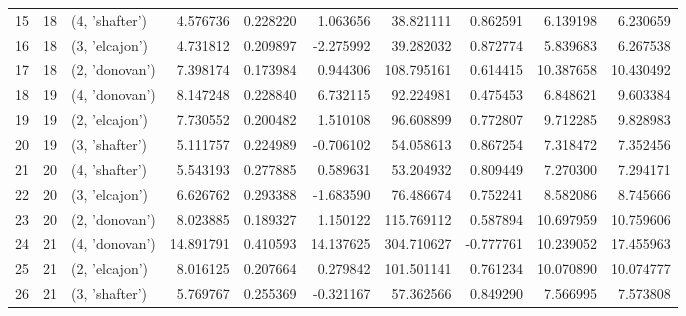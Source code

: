 \begin{tabular}{lrlrrrrrrr}
15 &     18 &  (4, 'shafter') &   4.576736 &  0.228220 &   1.063656 &   38.821111 &  0.862591 &   6.139198 &   6.230659 \\
16 &     18 &  (3, 'elcajon') &   4.731812 &  0.209897 &  -2.275992 &   39.282032 &  0.872774 &   5.839683 &   6.267538 \\
17 &     18 &  (2, 'donovan') &   7.398174 &  0.173984 &   0.944306 &  108.795161 &  0.614415 &  10.387658 &  10.430492 \\
18 &     19 &  (4, 'donovan') &   8.147248 &  0.228840 &   6.732115 &   92.224981 &  0.475453 &   6.848621 &   9.603384 \\
19 &     19 &  (2, 'elcajon') &   7.730552 &  0.200482 &   1.510108 &   96.608899 &  0.772807 &   9.712285 &   9.828983 \\
20 &     19 &  (3, 'shafter') &   5.111757 &  0.224989 &  -0.706102 &   54.058613 &  0.867254 &   7.318472 &   7.352456 \\
21 &     20 &  (4, 'shafter') &   5.543193 &  0.277885 &   0.589631 &   53.204932 &  0.809449 &   7.270300 &   7.294171 \\
22 &     20 &  (3, 'elcajon') &   6.626762 &  0.293388 &  -1.683590 &   76.486674 &  0.752241 &   8.582086 &   8.745666 \\
23 &     20 &  (2, 'donovan') &   8.023885 &  0.189327 &   1.150122 &  115.769112 &  0.587894 &  10.697959 &  10.759606 \\
24 &     21 &  (4, 'donovan') &  14.891791 &  0.410593 &  14.137625 &  304.710627 & -0.777761 &  10.239052 &  17.455963 \\
25 &     21 &  (2, 'elcajon') &   8.016125 &  0.207664 &   0.279842 &  101.501141 &  0.761234 &  10.070890 &  10.074777 \\
26 &     21 &  (3, 'shafter') &   5.769767 &  0.255369 &  -0.321167 &   57.362566 &  0.849290 &   7.566995 &   7.573808 \\
\bottomrule
\end{tabular}
